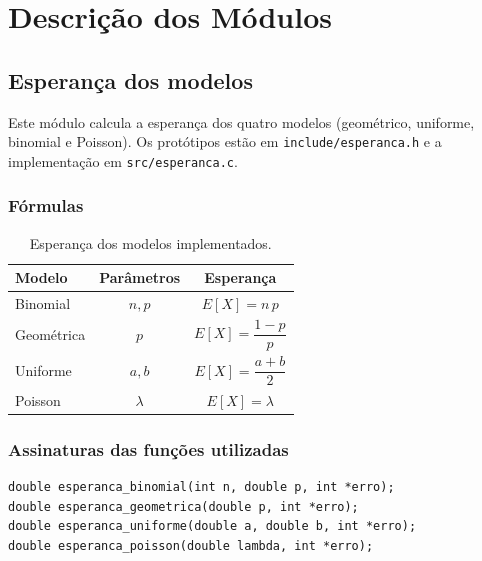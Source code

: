 \documentclass[12pt,a4paper]{article}
\newcommand{\cod}[1]{\texttt{#1}}
\begin{document}
\section{Descrição dos Módulos}

\subsection{Esperança dos modelos}
\label{sec:esperanca}
Este módulo calcula a esperança dos quatro modelos (geométrico, uniforme, binomial e Poisson). Os protótipos estão em
\cod{include/esperanca.h} e a implementação em \cod{src/esperanca.c}.

\subsubsection{Fórmulas}
\begin{table}[h]
\centering
\begin{tabular}{@{}lcc@{}}
\toprule
Modelo & Parâmetros & Esperança \\
\midrule
Binomial   & $n, p$    & $E[X] = n\,p$ \\
Geométrica & $p$       & $E[X] = \dfrac{1-p}{p}$ \\
Uniforme   & $a, b$    & $E[X] = \dfrac{a+b}{2}$ \\
Poisson    & $\lambda$ & $E[X] = \lambda$ \\
\bottomrule
\end{tabular}
\caption{Esperança dos modelos implementados.}
\end{table}

\subsubsection{Assinaturas das funções utilizadas}
\begin{lstlisting}
double esperanca_binomial(int n, double p, int *erro);
double esperanca_geometrica(double p, int *erro);
double esperanca_uniforme(double a, double b, int *erro);
double esperanca_poisson(double lambda, int *erro);
\end{lstlisting}
\end{document}
